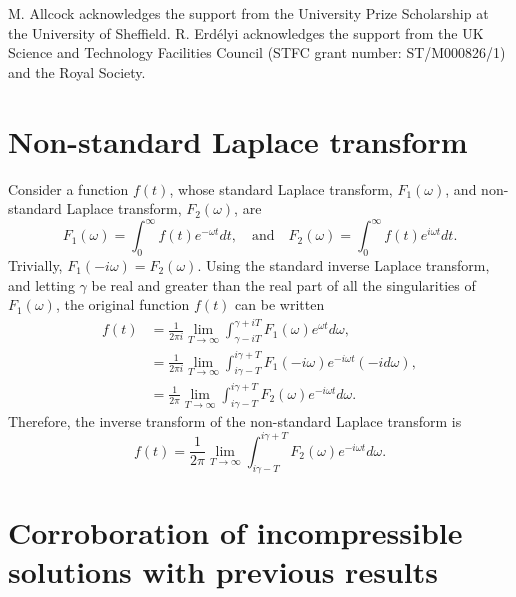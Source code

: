 \documentclass{aastex61}
\begin{document}
\acknowledgments
M. Allcock acknowledges the support from the University Prize Scholarship at the University of Sheffield. R. Erd\'{e}lyi acknowledges the support from the UK Science and Technology Facilities Council (STFC grant number: ST/M000826/1) and the Royal Society. 


\appendix

\section{Non-standard Laplace transform}\label{app: laplace trans}
Consider a function $f(t)$, whose standard Laplace transform, $F_1(\omega)$, and non-standard Laplace transform, $F_2(\omega)$, are
\begin{equation}
F_1(\omega) = \int_0^\infty f(t) e^{-\omega t} dt,
\quad \text{and} \quad
F_2(\omega) = \int_0^\infty f(t) e^{i\omega t} dt.
\end{equation}
Trivially, $F_1(-i\omega) = F_2(\omega)$. Using the standard inverse Laplace transform, and letting $\gamma$ be real and greater than the real part of all the singularities of $F_1(\omega)$, the original function $f(t)$ can be written
\begin{align}
f(t) & = \frac{1}{2\pi i} \lim_{T\to\infty} \int_{\gamma - iT}^{\gamma + iT} F_1(\omega)e^{\omega t} d\omega, \\
& = \frac{1}{2\pi i} \lim_{T\to\infty} \int_{i\gamma - T}^{i\gamma + T} F_1(-i\omega)e^{-i\omega t} (-id\omega), \\
& = \frac{1}{2\pi} \lim_{T\to\infty} \int_{i\gamma - T}^{i\gamma + T} F_2(\omega)e^{-i\omega t} d\omega.
\end{align}
Therefore, the inverse transform of the non-standard Laplace transform is
\begin{equation}
f(t) = \frac{1}{2\pi} \lim_{T\to\infty} \int_{i\gamma - T}^{i\gamma + T} F_2(\omega)e^{-i\omega t} d\omega.
\end{equation}


\section{Corroboration of incompressible solutions with previous results}
\end{document}
